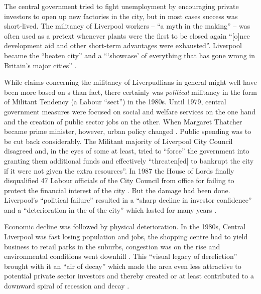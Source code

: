 The central government tried to fight unemployment by encouraging private investors to open up new factories in the city, but in most cases success was short-lived.
The militancy of Liverpool workers -- ``a myth in the making'' -- was often used as a pretext whenever  plants were the first to be closed again ``[o]nce development aid and other short-term advantages were exhausted''\citep[cf.][52]{belchem2006a}.
Liverpool became the ``beaten city'' and a ```showcase' of everything that has gone wrong in Britain's major cities'' \citep[\emph{Daily Mirror}, 11 October 1982, cited in][52--53]{belchem2006a}.

While claims concerning the militancy of Liverpudlians in general might well have been more based on s than fact, there certainly was \emph{political} militancy in the form of Militant Tendency (a Labour ``sect'') in the 1980s.
Until 1979, central government measures were focused on social and welfare services on the one hand and the creation of public sector jobs on the other. When Margaret Thatcher became prime minister, however, urban policy changed \citep[cf.][19]{juddparkinson1990a}.
Public spending was to be cut back considerably.
The Militant majority of Liverpool City Council disagreed and, in the eyes of some at least, tried to \enquote{force} the government into granting them additional funds and effectively ``threaten[ed] to bankrupt the city if it were not given the extra resources''.
In 1987 the House of Lords finally disqualified 47 Labour officials of the City Council from office for failing to protect the financial interest of the city \citep[cf.][249--250]{parkinson1990}.
But the damage had been done.
Liverpool's ``political failure'' \citep[241]{parkinson1990} resulted in a ``sharp decline in investor confidence'' and a ``deterioration in the  of the city'' which lasted for many years \citep[172]{couch2003a}.

Economic decline was followed by physical deterioration.
In the 1980s, Central Liverpool was fast losing population and jobs, the shopping centre had to yield business to retail parks in the suburbs, congestion was on the rise and environmental conditions went downhill \citep[cf.][38]{couch2003}.
This ``visual legacy of dereliction'' brought with it an ``air of decay'' which made the area even less attractive to potential private sector investors and thereby created or at least contributed to a downward spiral of recession and decay \citep[21]{fraser2003}.
 

